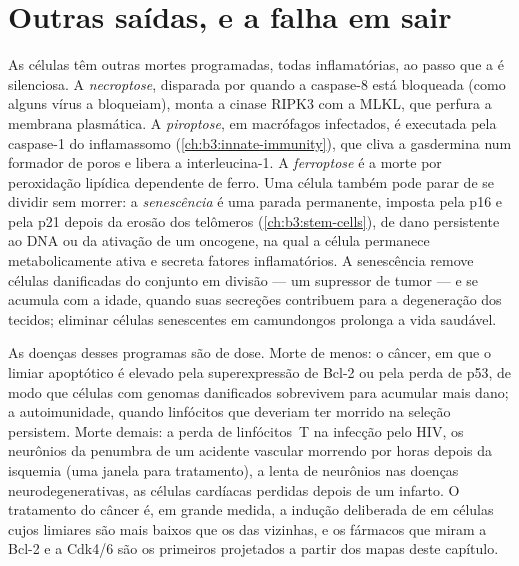 \section{Outras saídas, e a falha em sair}

\begin{definition}\label{def:b3:cell-cycle-apoptosis:other}
As células têm outras mortes programadas, todas inflamatórias, ao passo
que a  é silenciosa. A \emph{necroptose}, disparada por
 quando a caspase-8 está bloqueada (como alguns
vírus a bloqueiam), monta a cinase RIPK3 com a MLKL, que perfura a
membrana plasmática. A \emph{piroptose}, em macrófagos infectados, é
executada pela caspase-1 do inflamassomo
(\cref{ch:b3:innate-immunity}), que cliva a gasdermina num formador de
poros e libera a interleucina-1. A \emph{ferroptose} é a morte por
peroxidação lipídica dependente de ferro. Uma célula também pode parar
de se dividir sem morrer: a \emph{senescência} é uma parada permanente,
imposta pela p16 e pela p21 depois da erosão dos telômeros
(\cref{ch:b3:stem-cells}), de dano persistente ao DNA ou da ativação de
um oncogene, na qual a célula permanece metabolicamente ativa e secreta
fatores inflamatórios. A senescência remove células danificadas do
conjunto em divisão --- um supressor de tumor --- e se acumula com a
idade, quando suas secreções contribuem para a degeneração dos tecidos;
eliminar células senescentes em camundongos prolonga a vida saudável.
\end{definition}

\begin{remark}\label{rem:b3:cell-cycle-apoptosis:disease}
As doenças desses programas são de dose. Morte de menos: o câncer, em
que o limiar apoptótico é elevado pela superexpressão de Bcl-2 ou pela
perda de p53, de modo que células com genomas danificados sobrevivem
para acumular mais dano; a autoimunidade, quando linfócitos que
deveriam ter morrido na seleção persistem. Morte demais: a perda de
linfócitos~T na infecção pelo HIV, os neurônios da penumbra de um
acidente vascular morrendo por  horas depois da isquemia (uma
janela para tratamento), a  lenta de neurônios nas doenças
neurodegenerativas, as células cardíacas perdidas depois de um infarto.
O tratamento do câncer é, em grande medida, a indução deliberada de
 em células cujos limiares são mais baixos que os das vizinhas,
e os fármacos que miram a Bcl-2 e a Cdk4/6 são os primeiros projetados
a partir dos mapas deste capítulo.
\end{remark}

